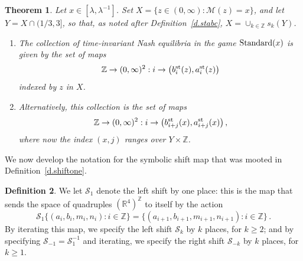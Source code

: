 \documentclass[letterpaper,11pt,oneside,reqno]{amsbook}
\newcommand{\R}{\ensuremath{\mathbb{R}}}
\newcommand{\Z}{\ensuremath{\mathbb{Z}}}
\newtheorem{theorem}{Theorem}[chapter]
\numberwithin{figure}{chapter}
\theoremstyle{definition}
\theoremstyle{definition}
\theoremstyle{definition}
\newtheorem{definition}[theorem]{Definition}
\theoremstyle{definition}
\theoremstyle{definition}
\newcommand{\mc}{\mathcal}
\newcommand{\standard}{{\rm Standard}}
\newcommand{\asta}{a^{\rm st}}
\newcommand{\bst}{b^{\rm st}}
\newcommand{\minamm}{\mathcal{M}}
\begin{document}
\begin{theorem}\label{t.nashequil}
Let $x \in [\lambda,\lambda^{-1}]$.  Set $X = \big\{ z \in (0,\infty): \minamm(z) = x \big\}$, and let $Y = X \cap (1/3,3]$, so that, as noted after Definition~\ref{d.stabc},  $X = \cup_{k \in \Z} s_k(Y)$.
\begin{enumerate}
\item
The collection of time-invariant Nash equilibria in the game $\standard(x)$ is  given by the set of maps
$$
\Z \to (0,\infty)^2: i \to \big(\bst_i(z),\asta_i(z) \big)
$$
indexed by $z$ in $X$.
\item Alternatively, 
this collection is the set of maps
$$
 \Z \to (0,\infty)^2: i \to \big(\bst_{i+j}(x),\asta_{i+j}(x) \big) \, ,
$$
where now the index $(x,j)$ ranges over $Y \times \Z$.
\end{enumerate}
\end{theorem}

We now develop the notation for the symbolic shift map that was mooted in Definition~\ref{d.shiftone}.  
\begin{definition}\label{d.shiftmap}
 We let $\mc{S}_1$ denote the left shift by one place: this is the map that sends the space of quadruples $(\R^4)^\Z$ to itself by the action 
 $$
  \mc{S}_1 \big\{ (a_i,b_i,m_i,n_i): i \in \Z \big\} =  \big\{ (a_{i+1},b_{i+1},m_{i+1},n_{i+1}): i \in \Z \big\} \, .
 $$
 By iterating this map, we specify the left shift $\mc{S}_k$ by $k$ places, for $k \geq 2$;
 and by specifying $\mc{S}_{-1} = \mc{S}_1^{-1}$ and iterating, we specify the right shift $\mc{S}_{-k}$ by $k$ places, for $k \geq 1$.
 \end{definition}
 
\end{document}
